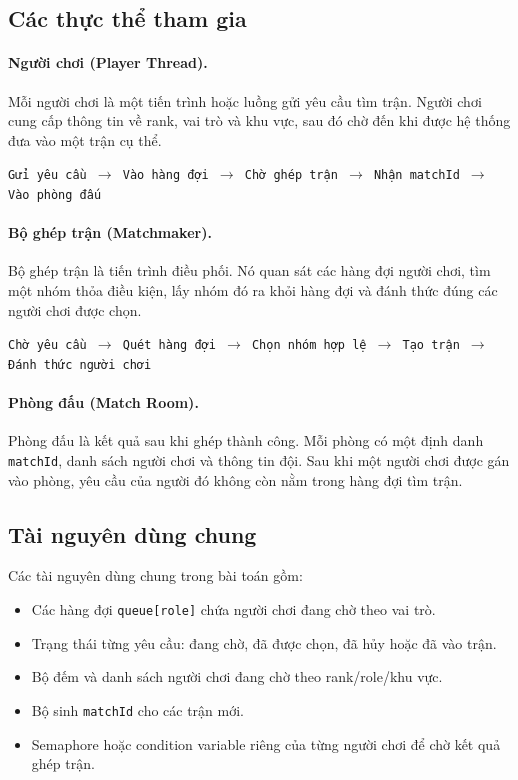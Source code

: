 \subsection{Các thực thể tham gia}

\paragraph{Người chơi (Player Thread).}
Mỗi người chơi là một tiến trình hoặc luồng gửi yêu cầu tìm trận. Người chơi
cung cấp thông tin về rank, vai trò và khu vực, sau đó chờ đến khi được hệ
thống đưa vào một trận cụ thể.

\begin{center}
\texttt{Gửi yêu cầu $\rightarrow$ Vào hàng đợi $\rightarrow$ Chờ ghép trận
$\rightarrow$ Nhận matchId $\rightarrow$ Vào phòng đấu}
\end{center}

\paragraph{Bộ ghép trận (Matchmaker).}
Bộ ghép trận là tiến trình điều phối. Nó quan sát các hàng đợi người chơi, tìm
một nhóm thỏa điều kiện, lấy nhóm đó ra khỏi hàng đợi và đánh thức đúng các
người chơi được chọn.

\begin{center}
\texttt{Chờ yêu cầu $\rightarrow$ Quét hàng đợi $\rightarrow$ Chọn nhóm hợp lệ
$\rightarrow$ Tạo trận $\rightarrow$ Đánh thức người chơi}
\end{center}

\paragraph{Phòng đấu (Match Room).}
Phòng đấu là kết quả sau khi ghép thành công. Mỗi phòng có một định danh
\texttt{matchId}, danh sách người chơi và thông tin đội. Sau khi một người chơi
được gán vào phòng, yêu cầu của người đó không còn nằm trong hàng đợi tìm trận.

\subsection{Tài nguyên dùng chung}

Các tài nguyên dùng chung trong bài toán gồm:

\begin{itemize}
    \item Các hàng đợi \texttt{queue[role]} chứa người chơi đang chờ theo vai trò.
    \item Trạng thái từng yêu cầu: đang chờ, đã được chọn, đã hủy hoặc đã vào trận.
    \item Bộ đếm và danh sách người chơi đang chờ theo rank/role/khu vực.
    \item Bộ sinh \texttt{matchId} cho các trận mới.
    \item Semaphore hoặc condition variable riêng của từng người chơi để chờ
    kết quả ghép trận.
\end{itemize}

